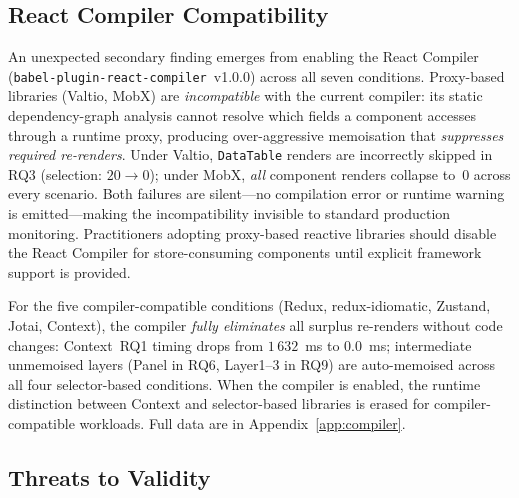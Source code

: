 \documentclass[conference]{IEEEtran}
\newcommand{\code}[1]{\texttt{\small #1}}
\begin{document}
\subsection{React Compiler Compatibility}
\label{sec:compiler}

An unexpected secondary finding emerges from enabling the React
Compiler~\cite{b13} (\code{babel-plugin-react-compiler}~v1.0.0) across
all seven conditions.  Proxy-based libraries (Valtio, MobX) are
\emph{incompatible} with the current compiler: its static
dependency-graph analysis cannot resolve which fields a component
accesses through a runtime proxy, producing over-aggressive memoisation
that \emph{suppresses required re-renders}.  Under Valtio,
\code{DataTable} renders are incorrectly skipped in RQ3 (selection:
$20{\to}0$); under MobX, \emph{all} component renders collapse to~0
across every scenario.  Both failures are silent---no compilation error
or runtime warning is emitted---making the incompatibility invisible to
standard production monitoring.
Practitioners adopting proxy-based reactive libraries should disable
the React Compiler for store-consuming components until explicit
framework support is provided.

For the five compiler-compatible conditions (Redux, redux-idiomatic,
Zustand, Jotai, Context), the compiler \emph{fully eliminates} all
surplus re-renders without code changes: Context~RQ1 timing drops from
$1\,632$~ms to $0.0$~ms; intermediate unmemoised layers (Panel in RQ6,
Layer1--3 in RQ9) are auto-memoised across all four selector-based
conditions.  When the compiler is enabled, the runtime distinction
between Context and selector-based libraries is erased for
compiler-compatible workloads.  Full data are in
Appendix~\ref{app:compiler}.

\subsection{Threats to Validity}
\label{sec:threats}
\end{document}
